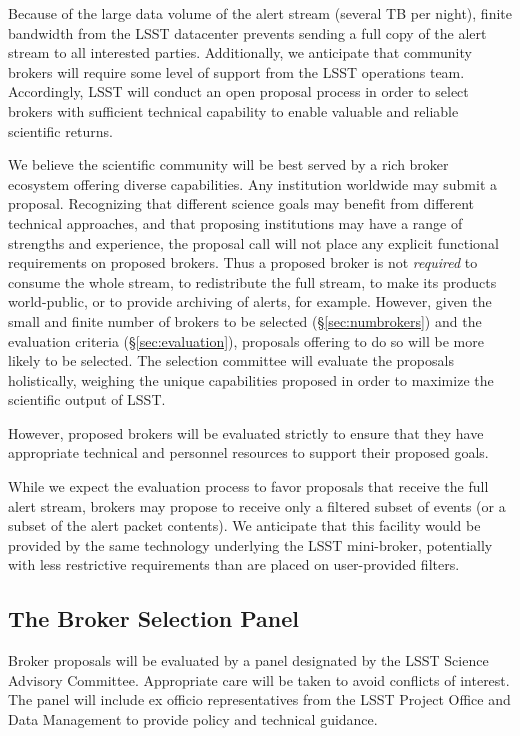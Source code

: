 Because of the large data volume of the alert stream (several TB per night), finite bandwidth from the LSST datacenter prevents sending a full copy of the alert stream to all interested parties.
Additionally, we anticipate that community brokers will require some level of support from the LSST operations team.
Accordingly, LSST will conduct an open proposal process in order to select brokers with sufficient technical capability to enable valuable and reliable scientific returns.

We believe the scientific community will be best served by a rich broker ecosystem offering diverse capabilities. 
Any institution worldwide may submit a proposal.
Recognizing that different science goals may benefit from different technical approaches, and that proposing institutions may have a range of strengths and experience, the proposal call will not place any explicit functional requirements on proposed brokers.  
Thus a proposed broker is not \textit{required} to consume the whole stream, to redistribute the full stream, to make its products world-public, or to provide archiving of alerts, for example.
However, given the small and finite number of brokers to be selected (\S \ref{sec:numbrokers}) and the evaluation criteria (\S \ref{sec:evaluation}), proposals offering to do so will be more likely to be selected.
The selection committee will evaluate the proposals holistically, weighing the unique capabilities proposed in order to maximize the scientific output of LSST.

However, proposed brokers will be evaluated strictly to ensure that they have appropriate technical and personnel resources to support their proposed goals.

While we expect the evaluation process to favor proposals that receive the full alert stream, brokers may propose to receive only a filtered subset of events (or a subset of the alert packet contents).  
We anticipate that this facility would be provided by the same technology underlying the LSST mini-broker, potentially with less restrictive requirements than are placed on user-provided filters. 

\subsection{The Broker Selection Panel}

Broker proposals will be evaluated by a panel designated by the LSST Science Advisory Committee.  Appropriate care will be taken to avoid conflicts of interest.
The panel will include ex officio representatives from the LSST Project Office and Data Management to provide policy and technical guidance.

